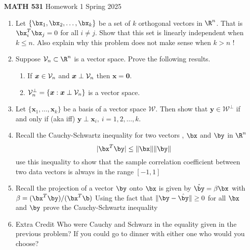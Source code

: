 \documentclass[11pt]{article}
\begin{document}
%
%

 { \large \textbf{MATH 531}  Homework 1  Spring 2025 }\\
%
%
\begin{enumerate}
%
%

%
\item 
Let  $\{\bx_1, \bx_2,\ldots , \bx_k \}$ be a set of $k$ orthogonal vectors in $\R^n$. That is $\bx_i^T \bx_j = 0$ for all $i\ne j$. Show that this set is linearly independent when  $k\le n$. Also explain why this problem does not make sense when $k >  n$ !

%
%
\item Suppose ${\cal V}_{n} \subset \R^n$ is a vector space. Prove the following results.
%
%
\begin{enumerate}
\item If  $\bm{x}\in {\cal V}_{n}$ and $\bm{x}\perp {\cal V}_{n}$ then $\bm{x}=\bm{0}$.
\item ${\cal V}_{n}^{\perp}=\{\bm{x}:\bm{x}\perp {\cal V}_{n}\}$ is a vector space.
\end{enumerate}

\item Let $\{\bm{x}_{1},\ldots,\bm{x}_{k}\}$ be a basis of a vector space $\mathcal{W}$. Then show that $\bm{y} \in \mathcal{W}^\perp$ if and only if  (aka iff) $\bm{y}\perp \bm{x}_{i},\ i=1,2,\ldots,k$.
%
%
\item Recall the Cauchy-Schwartz inequality  for two vectors , $\bx$ and $\by$  in $\R^n$
\[  | \bx^T \by |  \le \| \bx \| \| \by \| \]
use this inequality to show that the sample correlation coefficient between two data vectors is always in the range  $[-1, 1]$

\item Recall the projection of a vector $\by$ onto $\bx$ is given by  $\hat{\by}= \beta \bx$ with $\beta = (\bx^T \by)/ (\bx^T \b)$
Using the fact that $\| \by - \hat{\by} \| \ge 0 $ for all $\bx$ and $\by$ prove the Cauchy-Schwartz inequality 

\item Extra Credit  Who were Cauchy and Schwarz in the equality given in the previous problem?  If you could go to dinner with either one who would you choose?


\end{enumerate}
%
%
%
%
%
%
%
%
\end{document}
